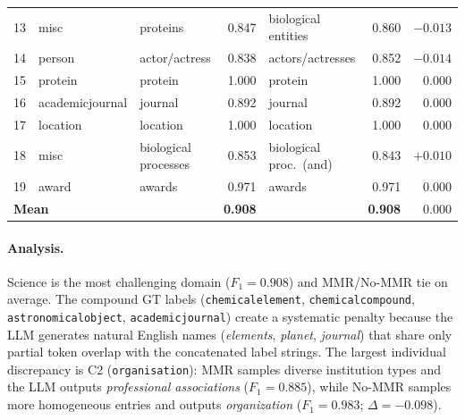 \documentclass[11pt,a4paper]{article}
\begin{document}
\begin{table}[h]
\begin{tabular}{r l l r l r r}
13 & misc             & proteins               & \cellcolor{red!15}0.847 & biological entities  & \cellcolor{red!15}0.860 & $-0.013$ \\
14 & person           & actor/actress          & \cellcolor{red!15}0.838 & actors/actresses     & \cellcolor{red!15}0.852 & $-0.014$ \\
15 & protein          & protein                & \cellcolor{green!15}1.000 & protein             & \cellcolor{green!15}1.000 & $0.000$ \\
16 & academicjournal  & journal                & \cellcolor{red!15}0.892 & journal              & \cellcolor{red!15}0.892 & $0.000$ \\
17 & location         & location               & \cellcolor{green!15}1.000 & location            & \cellcolor{green!15}1.000 & $0.000$ \\
18 & misc             & biological processes   & \cellcolor{red!15}0.853 & biological proc.\ (and) & \cellcolor{red!15}0.843 & $+0.010$ \\
19 & award            & awards                 & \cellcolor{yellow!25}0.971 & awards              & \cellcolor{yellow!25}0.971 & $0.000$ \\
\midrule
\multicolumn{2}{l}{\textbf{Mean}} &
  & \textbf{0.908} & & \textbf{0.908} & $0.000$ \\
\bottomrule
\end{tabular}
\end{table}

\paragraph{Analysis.}
Science is the most challenging domain ($F_1 = 0.908$) and MMR/No-MMR tie on average.
The compound GT labels (\texttt{chemicalelement}, \texttt{chemicalcompound}, \texttt{astronomicalobject}, \texttt{academicjournal}) create a systematic penalty because the LLM generates natural English names (\textit{elements}, \textit{planet}, \textit{journal}) that share only partial token overlap with the concatenated label strings.
The largest individual discrepancy is C2 (\texttt{organisation}): MMR samples diverse institution types and the LLM outputs \textit{professional associations} ($F_1 = 0.885$), while No-MMR samples more homogeneous entries and outputs \textit{organization} ($F_1 = 0.983$; $\Delta = -0.098$).

\FloatBarrier

\end{document}
